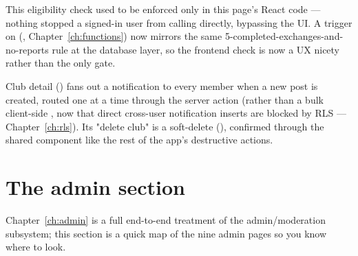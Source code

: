 \begin{olknote}
This eligibility check used to be enforced only in this page's React code — nothing stopped a signed-in user from calling  directly, bypassing the UI. A  trigger on  (, Chapter~\ref{ch:functions}) now mirrors the same 5-completed-exchanges-and-no-reports rule at the database layer, so the frontend check is now a UX nicety rather than the only gate.
\end{olknote}

Club detail () fans out a notification to every member when a new post is created, routed one at a time through the  server action (rather than a bulk client-side , now that direct cross-user notification inserts are blocked by RLS — Chapter~\ref{ch:rls}). Its "delete club" is a soft-delete (), confirmed through the shared  component like the rest of the app's destructive actions.

\section{The admin section}

Chapter~\ref{ch:admin} is a full end-to-end treatment of the admin/moderation subsystem; this section is a quick map of the nine admin pages so you know where to look.

